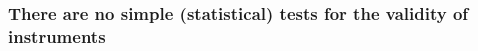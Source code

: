 \documentclass[12pt,reqno,titlepage]{amsart}
\begin{document}
\begin{doublespace}



\subsubsection{There are no simple (statistical) tests for the validity of instruments}


\end{doublespace}
\end{document}
